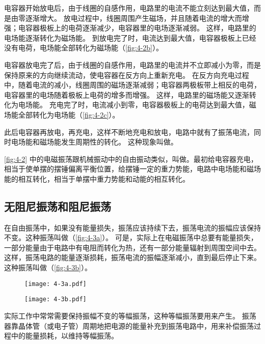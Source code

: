电容器开始放电后，由于线圈的自感作用，电路里的电流不能立刻达到最大值，而是由零逐渐增大。
放电过程中，线圈周围产生磁场，并且随着电流的增大而增强；电容器极板上的电荷逐渐减少，电容器里的电场逐渐减弱。
这样，电路里的电场能逐渐转化为磁场能。
到放电完了时，电流达到最大值，电容器极板上已经没有电荷，电场能全部转化为磁场能（\cref{fig:4-2b}）。

电容器放电完了后，由于线圈的自感作用，电路里的电流并不立即减小为零，而是保持原来的方向继续流动，使电容器在反方向上重新充电。
在反方向充电过程中，随着电流的减小，线圈周围的磁场逐渐减弱；电容器两极板带上相反的电荷，电容器里的电场随着极板上电荷的增多而增强。
这样，电路里的磁场能又逐渐转化为电场能。
充电完了时，电流减小到零，电容器极板上的电荷达到最大值，磁场能全部转化为电场能（\cref{fig:4-2c}）。

此后电容器再放电，再充电，这样不断地充电和放电，电路中就有了振荡电流，同时电场能和磁场能发生周期性的转化。
这种现象叫做。

\cref{fig:4-2} 中的电磁振荡跟机械振动中的自由振动类似，叫做。最初给电容器充电，相当于使单摆的摆锤偏离平衡位置，给摆锤一定的重力势能，电路中电场能和磁场能的相互转化，相当于单摆中重力势能和动能的相互转化。

\subsection{无阻尼振荡和阻尼振荡}
在自由振荡中，如果没有能量损失，振荡应该持续下去，振荡电流的振幅应该保持不变。这种振荡叫做（\cref{fig:4-3a}）。
可是，实际上在电磁振荡中总要有能量损失，一部分能量由于电路中有电阻而转化为热，还有一部分能量辐射到周围空间中去。
这样，振荡电路的能量逐渐损耗，振荡电流的振幅逐渐减小，直到最后停止下来。
这种振荡叫做（\cref{fig:4-3b}）。
\begin{figure}
	\begin{minipage}{\linewidth}\centering
		\texttt{[image: 4-3a.pdf]}
		\label{fig:4-3a}
	\end{minipage}
	\begin{minipage}{\linewidth}\centering
		\texttt{[image: 4-3b.pdf]}
		\label{fig:4-3b}
	\end{minipage}
	\caption{}\label{fig:4-3}
\end{figure}

实际工作中常常需要保持振幅不变的等幅振荡，这种等幅振荡要用来产生。
振荡器靠晶体管（或电子管）周期地把电源的能量补充到振荡电路中，用来补偿振荡过程中的能量损耗，以维持等幅振荡。

